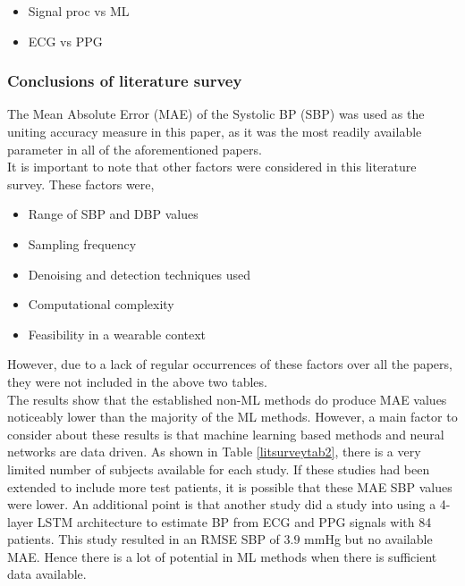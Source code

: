 \begin{itemize}
  \item Signal proc vs ML
  \item ECG vs PPG
\end{itemize}

\subsubsection{Conclusions of literature survey}

The Mean Absolute Error (MAE) of the Systolic BP (SBP) was used as the uniting accuracy measure in this paper, as it was the most readily available parameter in all of the aforementioned papers. \\ \newline \noindent It is important to note that other factors were considered in this literature survey. These factors were, \begin{itemize}
    \item Range of SBP and DBP values 
    \item Sampling frequency
    \item Denoising and detection techniques used
    \item Computational complexity
    \item Feasibility in a wearable context
\end{itemize}\noindent However, due to a lack of regular occurrences of these factors over all the papers, they were not included in the above two tables.\\ \newline \noindent The results show that the established non-ML methods do produce MAE values noticeably lower than the majority of the ML methods. However, a main factor to consider about these results is that machine learning based methods and neural networks are data driven. As shown in Table \ref{litsurveytab2}, there is a very limited number of subjects available for each study. If these studies had been extended to include more test patients, it is possible that these MAE SBP values were lower. An additional point is that another study \cite{Su2017} did a study into using a 4-layer LSTM architecture to estimate BP from ECG and PPG signals with 84 patients. This study resulted in an RMSE SBP of $3.9$ mmHg but no available MAE. Hence there is a lot of potential in ML methods when there is sufficient data available.